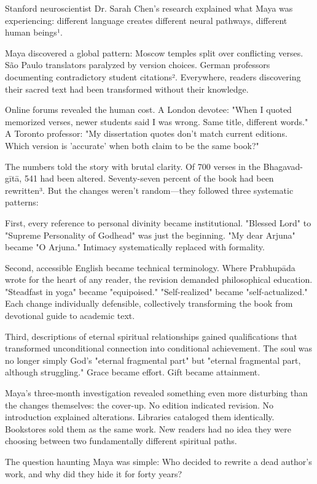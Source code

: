 \documentclass[11pt,twoside]{book}
\begin{document}
Stanford neuroscientist Dr. Sarah Chen's research explained what Maya was experiencing: different language creates different neural pathways, different human beings¹.

Maya discovered a global pattern: Moscow temples split over conflicting verses. São Paulo translators paralyzed by version choices. German professors documenting contradictory student citations². Everywhere, readers discovering their sacred text had been transformed without their knowledge.

Online forums revealed the human cost. A London devotee: "When I quoted memorized verses, newer students said I was wrong. Same title, different words." A Toronto professor: "My dissertation quotes don't match current editions. Which version is 'accurate' when both claim to be the same book?"

The numbers told the story with brutal clarity. Of 700 verses in the Bhagavad-gītā, 541 had been altered. Seventy-seven percent of the book had been rewritten³. But the changes weren't random—they followed three systematic patterns:

First, every reference to personal divinity became institutional. "Blessed Lord" to "Supreme Personality of Godhead" was just the beginning. "My dear Arjuna" became "O Arjuna." Intimacy systematically replaced with formality.

Second, accessible English became technical terminology. Where Prabhupāda wrote for the heart of any reader, the revision demanded philosophical education. "Steadfast in yoga" became "equipoised." "Self-realized" became "self-actualized." Each change individually defensible, collectively transforming the book from devotional guide to academic text.

Third, descriptions of eternal spiritual relationships gained qualifications that transformed unconditional connection into conditional achievement. The soul was no longer simply God's "eternal fragmental part" but "eternal fragmental part, although struggling." Grace became effort. Gift became attainment.

Maya's three-month investigation revealed something even more disturbing than the changes themselves: the cover-up. No edition indicated revision. No introduction explained alterations. Libraries cataloged them identically. Bookstores sold them as the same work. New readers had no idea they were choosing between two fundamentally different spiritual paths.

The question haunting Maya was simple: Who decided to rewrite a dead author's work, and why did they hide it for forty years?
\end{document}
